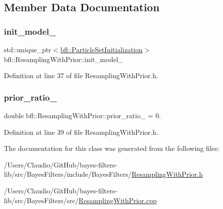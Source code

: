 \subsection{Member Data Documentation}
\mbox{\label{classbfl_1_1ResamplingWithPrior_a8c04b13a27ef22963b1e5ea0a6db4daf}} 
\subsubsection{\texorpdfstring{init\+\_\+model\+\_\+}{init\_model\_}}
{\footnotesize\ttfamily std\+::unique\+\_\+ptr$<$\mbox{\hyperlink{classbfl_1_1ParticleSetInitialization}{bfl\+::\+Particle\+Set\+Initialization}}$>$ bfl\+::\+Resampling\+With\+Prior\+::init\+\_\+model\+\_\+\hspace{0.3cm}{\ttfamily [protected]}}



Definition at line 37 of file Resampling\+With\+Prior.\+h.

\mbox{\label{classbfl_1_1ResamplingWithPrior_a5f2d0d6f948348428a992232de091c66}} 
\subsubsection{\texorpdfstring{prior\+\_\+ratio\+\_\+}{prior\_ratio\_}}
{\footnotesize\ttfamily double bfl\+::\+Resampling\+With\+Prior\+::prior\+\_\+ratio\+\_\+ = 0.\hspace{0.3cm}{\ttfamily [protected]}}



Definition at line 39 of file Resampling\+With\+Prior.\+h.



The documentation for this class was generated from the following files\+:\begin{DoxyCompactItemize}
\item 
/\+Users/\+Claudio/\+Git\+Hub/bayes-\/filters-\/lib/src/\+Bayes\+Filters/include/\+Bayes\+Filters/\mbox{\hyperlink{ResamplingWithPrior_8h}{Resampling\+With\+Prior.\+h}}\item 
/\+Users/\+Claudio/\+Git\+Hub/bayes-\/filters-\/lib/src/\+Bayes\+Filters/src/\mbox{\hyperlink{ResamplingWithPrior_8cpp}{Resampling\+With\+Prior.\+cpp}}\end{DoxyCompactItemize}
